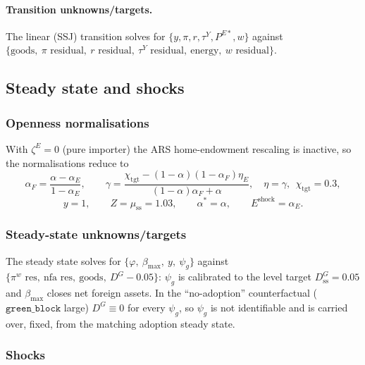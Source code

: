 \documentclass[11pt,a4paper]{article}
\newcommand{\stst}{\mathrm{ss}}
\newcommand{\DG}{D^{G}}
\begin{document}
\paragraph{Transition unknowns/targets.} The linear (SSJ) transition solves for
$\{y,\pi,r,\tau^{Y},P^{E*},w\}$ against
$\{\text{goods},\ \pi\text{ residual},\ r\text{ residual},\ \tau^{Y}\text{ residual},
\ \text{energy},\ w\text{ residual}\}$.

\subsection{Steady state and shocks}\label{sec:ss}

\subsubsection{Openness normalisations}

With $\zeta^{E}=0$ (pure importer) the ARS home-endowment rescaling is inactive,
so the normalisations reduce to
\begin{equation}
\alpha_F=\frac{\alpha-\alpha_E}{1-\alpha_E},\qquad
\gamma=\frac{\chi_{\text{tgt}}-(1-\alpha)(1-\alpha_F)\eta_E}{(1-\alpha)\alpha_F+\alpha},\quad \eta=\gamma,\ \ \chi_{\text{tgt}}=0.3,
\end{equation}
\begin{equation}
y=1,\qquad Z=\mu_{\stst}=1.03,\qquad \alpha^{*}=\alpha,\qquad E^{\text{shock}}=\alpha_E .
\end{equation}

\subsubsection{Steady-state unknowns/targets}

The steady state solves for $\{\varphi,\ \beta_{\max},\ y,\ \psi_g\}$ against
$\{\pi^{w}\text{ res},\ \mathrm{nfa}\text{ res},\ \text{goods},\ \DG-0.05\}$: $\psi_g$
is calibrated to the level target $\DG_{\stst}=0.05$ and $\beta_{\max}$ closes net
foreign assets. In the ``no-adoption'' counterfactual ($\texttt{green\_block}$
large) $\DG\equiv 0$ for every $\psi_g$, so $\psi_g$ is not identifiable and is
carried over, fixed, from the matching adoption steady state.

\subsubsection{Shocks}
\end{document}

